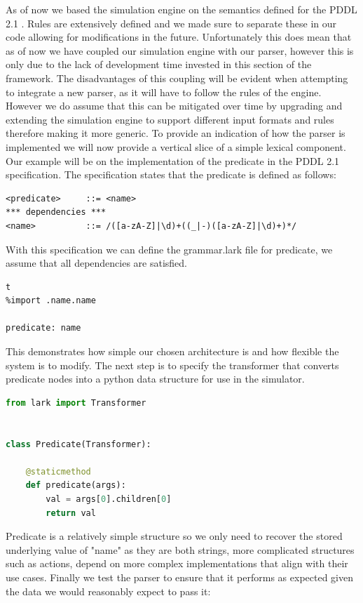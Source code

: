 As of now we based the simulation engine on the semantics defined for the PDDL 2.1 \cite{pddl21:online}. Rules are extensively defined and we made sure to separate these in our code allowing for modifications in the future. Unfortunately this does mean that as of now we have coupled our simulation engine with our parser, however this is only due to the lack of development time invested in this section of the framework. The disadvantages of this coupling will be evident when attempting to integrate a new parser, as it will have to follow the rules of the engine. However we do assume that this can be mitigated over time by upgrading and extending the simulation engine to support different input formats and rules therefore making it more generic.
\newpage
To provide an indication of how the parser is implemented we will now provide a vertical slice of a simple lexical component. Our example will be on the implementation of the predicate in the PDDL 2.1 specification. The specification states that the predicate is defined as follows:
\begin{lstlisting}
<predicate>     ::= <name>
*** dependencies ***
<name>          ::= /([a-zA-Z]|\d)+((_|-)([a-zA-Z]|\d)+)*/
\end{lstlisting}
With this specification we can define the grammar.lark file for predicate, we assume that all dependencies are satisfied. 

\begin{lstlisting}t
%import .name.name

predicate: name
\end{lstlisting}
This demonstrates how simple our chosen architecture is and how flexible the system is to modify. The next step is to specify the transformer that converts predicate nodes into a python data structure for use in the simulator.

\begin{lstlisting}[language=Python]
from lark import Transformer


class Predicate(Transformer):

    @staticmethod
    def predicate(args):
        val = args[0].children[0]
        return val

\end{lstlisting}
Predicate is a relatively simple structure so we only need to recover the stored underlying value of "name" as they are both strings, more complicated structures such as actions, depend on more complex implementations that align with their use cases.
Finally we test the parser to ensure that it performs as expected given the data we would reasonably expect to pass it:



